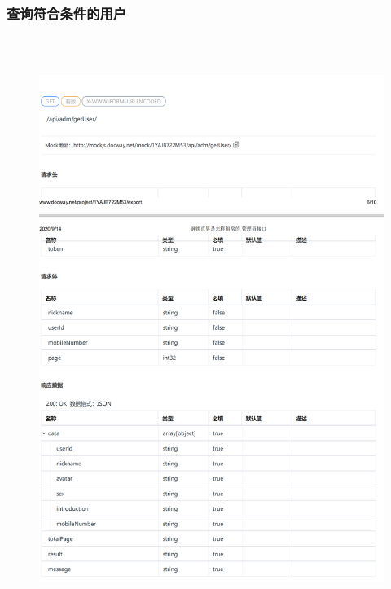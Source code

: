 \subsubsection{查询符合条件的用户}
\begin{figure}[h]
    \centering
    \includegraphics[height=19.0cm,width=14.0cm]{design/image/api39.png} 
    \end{figure}  
    \newpage

